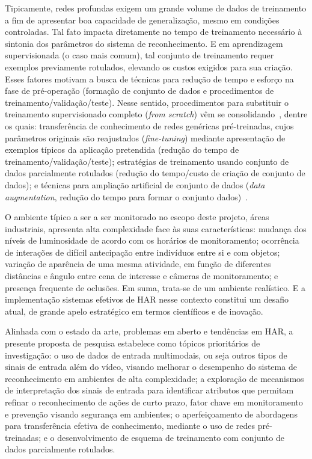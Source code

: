  Tipicamente, redes profundas exigem um grande volume de dados de treinamento a fim de apresentar boa capacidade de generalização, mesmo em condições controladas. Tal fato impacta diretamente no tempo de treinamento necessário à sintonia dos parâmetros do sistema de reconhecimento. E em aprendizagem supervisionada (o caso mais comum), tal conjunto de treinamento requer exemplos previamente rotulados, elevando os custos exigidos para sua criação. Esses fatores motivam a busca de técnicas para redução de tempo e esforço na fase de pré-operação (formação de conjunto de dados e procedimentos de treinamento/validação/teste). Nesse sentido, procedimentos para  substituir o treinamento supervisionado completo (\emph{from scratch}) vêm se consolidando~\parencite{herath-2017}, dentre os quais: transferência de conhecimento de redes genéricas pré-treinadas, cujos parâmetros originais são reajustados  (\emph{fine-tuning}) mediante apresentação de exemplos típicos da aplicação pretendida (redução do tempo de treinamento/validação/teste); estratégias de treinamento usando conjunto de dados parcialmente rotulados (redução do tempo/custo de criação de conjunto de dados); e técnicas para ampliação artificial de conjunto de dados (\emph{data augmentation}, redução do tempo para formar o conjunto dados)~\parencite{wang-2015}.
%

O ambiente típico a ser a ser monitorado no escopo deste projeto, áreas industriais, apresenta alta complexidade face às suas características: mudança dos níveis de luminosidade de acordo com os horários de monitoramento; ocorrência de interações de difícil antecipação entre indivíduos entre si e com objetos; variação de aparência de uma mesma atividade, em função de diferentes distâncias e ângulo entre cena de interesse e câmeras de monitoramento; e presença frequente de oclusões. Em suma, trata-se de um ambiente realístico. E a implementação sistemas efetivos de HAR nesse contexto constitui um desafio atual, de grande apelo estratégico em termos científicos e de inovação.
%

Alinhada com o estado da arte, problemas em aberto e tendências em HAR, a presente proposta de pesquisa estabelece como tópicos prioritários de investigação: o uso de dados de entrada  multimodais, ou seja outros tipos de sinais de entrada além do vídeo, visando melhorar o desempenho do sistema de reconhecimento em ambientes de alta complexidade; a exploração de mecanismos de interpretação dos sinais de entrada para identificar atributos que permitam refinar o reconhecimento de ações de curto prazo, fator chave em monitoramento e prevenção visando segurança em ambientes; o aperfeiçoamento de abordagens para transferência efetiva de conhecimento, mediante o uso de redes pré-treinadas; e o desenvolvimento de esquema de treinamento com conjunto de dados parcialmente rotulados.
